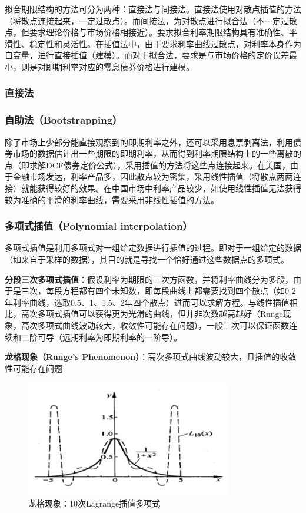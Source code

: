 \documentclass[11pt]{article}
\begin{document}
拟合期限结构的方法可分为两种：直接法与间接法。直接法使用对散点插值的方法（将散点连接起来，一定过散点）。而间接法，为对散点进行拟合法（不一定过散点，但要求理论价格与市场价格相接近）。要求拟合利率期限结构具有准确性、平滑性、稳定性和灵活性。在插值法中，由于要求利率曲线过散点，对利率本身作为自变量，进行直接插值（建模）。而对于拟合法，要求是与市场价格的定价误差最小，则是对即期利率对应的零息债券价格进行建模。

\subsubsection{直接法}

\subsubsection*{自助法（Bootstrapping）}

除了市场上少部分能直接观察到的即期利率之外，还可以采用息票剥离法，利用债券市场的数据估计出一些期限的即期利率，从而得到利率期限结构上的一些离散的点（即求解DCF债券定价公式），采用插值的方法将这些点连接起来。在美国，由于金融市场发达，利率产品多，因此散点较为密集，采用线性插值（将散点两两连接）就能获得较好的效果。在中国市场中利率产品较少，如使用线性插值无法获得较为准确的平滑的利率曲线，需要采用非线性插值的方法。

\subsubsection*{多项式插值（Polynomial interpolation）}

多项式插值是利用多项式对一组给定数据进行插值的过程。即对于一组给定的数据（如来自于采样的数据），其目的就是寻找一个恰好通过这些数据点的多项式。

\textbf{分段三次多项式插值}：假设利率为期限的三次方函数，并将利率曲线分为多段，由于是三次，每段方程都有四个未知数，即每段曲线上都需要找到四个散点（如0-2年利率曲线，选取0.5、1、1.5、2年四个散点）进而可以求解方程。与线性插值相比，高次多项式插值可以获得更为光滑的曲线，但并非次数越高越好（Runge现象，高次多项式曲线波动较大，收敛性可能存在问题），一般三次可以保证函数连续和二阶可导（远期利率为即期利率的一阶导）。

\textbf{龙格现象（Runge's Phenomenon）}：高次多项式曲线波动较大，且插值的收敛性可能存在问题
\begin{figure}[H]
    \centering
    \includegraphics[width=0.8\textwidth]{fig/runges-phenomenon.png}
	\caption{龙格现象：10次Lagrange插值多项式}
    \label{fig:runges-phenomenon}
\end{figure}
\end{document}
